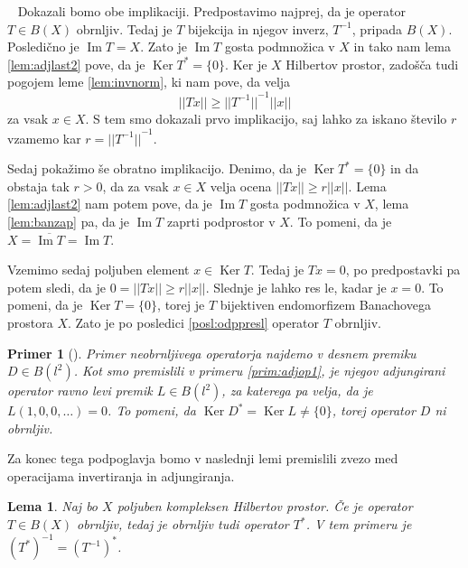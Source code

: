 \documentclass[12pt,a4paper,oneside,fleqn,openany]{book}
\newtheorem{lema}[izrek]{Lema}
\newtheorem{primer*}[izrek]{Primer}
\newcommand{\eopf}{\raisebox{0.8ex}{\framebox{}}} %
\newenvironment{dokaz}%
{\noindent{\bf Dokaz.}\ }%
{\hfill\eopf\par\bigskip}%
\newenvironment{primer}[1][]{\begin{primer*}[#1]\renewcommand*{\qedsymbol}{$\diamondsuit$}\pushQED{\qed}}{\popQED\end{primer*}}
\newcommand{\abs}[1]{\ensuremath{\lvert #1 \rvert}}
\newcommand{\norm}[1]{\abs{\abs{#1}}}
\begin{document}
\begin{dokaz}
	Dokazali bomo obe implikaciji.
	Predpostavimo najprej, da je operator $T\in B(X)$ obrnljiv. Tedaj je $T$ bijekcija in njegov inverz, $T^{-1}$, pripada $B(X)$. Posledično je $\operatorname{Im}T = X$. Zato je $\operatorname{Im}T$ gosta podmnožica v $X$ in tako nam lema \ref{lem:adjlast2} pove, da je $\operatorname{Ker}T^* = \{0\}$. Ker je $X$ Hilbertov prostor, zadošča tudi pogojem leme \ref{lem:invnorm}, ki nam pove, da velja $$\norm{Tx}\geq \norm{T^{-1}}^{-1}\norm{x}$$ za vsak $x\in X$. S tem smo dokazali prvo implikacijo, saj lahko za iskano število $r$ vzamemo kar $r = \norm{T^{-1}}^{-1}$.
	
	Sedaj pokažimo še obratno implikacijo. Denimo, da je $\operatorname{Ker}T^* = \{0\}$ in da obstaja tak $r>0$, da za vsak $x\in X$ velja ocena $\norm{Tx} \geq r\norm{x}$. Lema \ref{lem:adjlast2} nam potem pove, da je $\operatorname{Im}T$ gosta podmnožica v $X$, lema \ref{lem:banzap} pa, da je $\operatorname{Im}T$ zaprti podprostor v $X$. To pomeni, da je $X = \overline{\operatorname{Im}T} = \operatorname{Im}T$.
	
	Vzemimo sedaj poljuben element $x\in \operatorname{Ker}T$. Tedaj je $Tx = 0$, po predpostavki pa potem sledi, da je $0 = \norm{Tx} \geq r\norm{x}$. Slednje je lahko res le, kadar je $x = 0$. To pomeni, da je $\operatorname{Ker}T = \{0\}$, torej je $T$ bijektiven endomorfizem Banachovega prostora $X$. Zato je po posledici \ref{posl:odppresl} operator $T$ obrnljiv.
\end{dokaz}

\begin{primer}
	\label{prim:adjinv}
	Primer neobrnljivega operatorja najdemo v desnem premiku $D\in B(l^2)$. Kot smo premislili v primeru \ref{prim:adjop1}, je njegov adjungirani operator ravno levi premik $L\in B(l^2)$, za katerega pa velja, da je $L(1, 0, 0, \ldots) = 0$. To pomeni, da $\operatorname{Ker}D^* = \operatorname{Ker}L \neq \{0\}$, torej operator $D$ ni obrnljiv.
\end{primer}

Za konec tega podpoglavja bomo v naslednji lemi premislili zvezo med operacijama invertiranja in adjungiranja.

\begin{lema}
	\label{lem:adjinv}
	Naj bo $X$ poljuben kompleksen Hilbertov prostor. Če je operator $T\in B(X)$ obrnljiv, tedaj je obrnljiv tudi operator $T^*$. V tem primeru je $(T^*)^{-1} = (T^{-1})^*$.
\end{lema}
\end{document}
